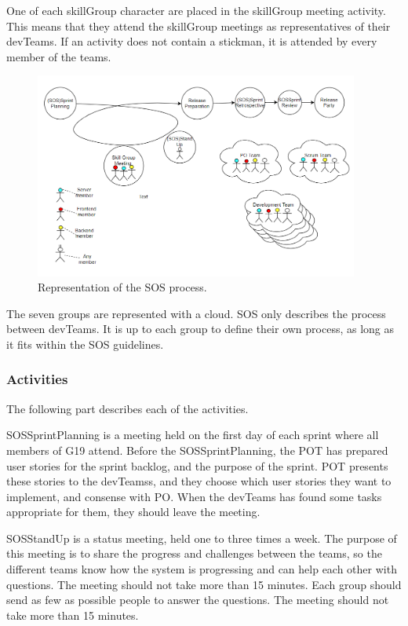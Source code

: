 One of each \gls{skillGroup} character are placed in the \gls{skillGroup} meeting activity. This means that they attend the \gls{skillGroup} meetings as representatives of their \glspl{devTeam}.
If an activity does not contain a stickman, it is attended by every member of the teams.

\begin{figure}[h]
    \begin{center}
        \includegraphics[width=0.95\textwidth]{figures/SOSProcess}
    \end{center}
    \caption{Representation of the \gls{SOS} process.}
    \label{fig:SOSProcess}
\end{figure}

The seven groups are represented with a cloud. \gls{SOS} only describes the process between \glspl{devTeam}. It is up to each group to define their own process, as long as it fits within the \gls{SOS} guidelines. 

\subsubsection{Activities}
The following part describes each of the activities.

\Gls{SOSSprintPlanning} is a meeting held on the first day of each sprint where all members of \Gls{G19} attend. Before the \Gls{SOSSprintPlanning}, the \gls{POT} has prepared user stories for the sprint backlog, and the purpose of the sprint. \gls{POT} presents these stories to the \glspl{devTeam}s, and they choose which user stories they want to implement, and consense with \gls{PO}. When the \glspl{devTeam} has found some tasks appropriate for them, they should leave the meeting.
 
\Gls{SOSStandUp} is a status meeting, held one to three times a week. The purpose of this meeting is to share the progress and challenges between the teams, so the different teams know how the system is progressing and can help each other with questions. The meeting should not take more than 15 minutes. 
Each group should send as few as possible people to answer the questions. The meeting should not take more than 15 minutes. 

